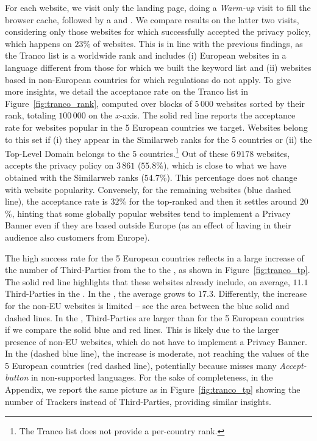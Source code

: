 For each website, we visit only the landing page, doing a \emph{Warm-up} visit to fill the browser cache, followed by a \BEFORE and \AFTER. We compare results on the latter two visits, considering only those websites for which \TOOL successfully accepted the privacy policy, which happens on $23$\% of websites. This is in line with the previous findings, as the Tranco list is a worldwide rank and includes (i) European websites in a language different from those for which we built the keyword list and (ii) websites based in non-European countries for which regulations do not apply. To give more insights, we detail the acceptance rate on the Tranco list in Figure~\ref{fig:tranco_rank}, computed over blocks of $5\,000$ websites sorted by their rank, totaling $100\,000$ on the $x$-axis. The solid red line reports the acceptance rate for websites popular in the 5 European countries we target. Websites belong to this set if (i) they appear in the Similarweb ranks for the 5 countries or (ii) the Top-Level Domain belongs to the 5 countries.\footnote{The Tranco list does not provide a per-country rank.} Out of these $6\,9178$ websites, \TOOL accepts the privacy policy on $3\,861$ ($55.8$\%), which is close to what we have obtained with the Similarweb ranks ($54.7\%$). This percentage does not change with website popularity. Conversely, for the remaining websites (blue dashed line), the acceptance rate is $32$\% for the top-ranked and then it settles around $20$\%, hinting that some globally popular websites tend to implement a Privacy Banner even if they are based outside Europe (as an effect of having in their audience also customers from Europe).

The high success rate for the 5 European countries reflects in a large increase of the number of Third-Parties from the \BEFORE to the \AFTER, as shown in Figure~\ref{fig:tranco_tp}. The solid red line highlights that these websites already include, on average, $11.1$ Third-Parties in the \BEFORE. In the \AFTER, the average grows to $17.3$. Differently, the increase for the non-EU websites is limited -- see the area between the blue solid and dashed lines. In the \BEFORE, Third-Parties are larger than for the 5 European countries if we compare the solid blue and red lines. This is likely due to the larger presence of non-EU websites, which do not have to implement a Privacy Banner. In the \AFTER (dashed blue line), the increase is moderate, not reaching the values of the 5 European countries (red dashed line), potentially because \TOOL misses many \emph{Accept-button} in non-supported languages. For the sake of completeness, in the Appendix, we report the same picture as in Figure~\ref{fig:tranco_tp} showing the number of Trackers instead of Third-Parties, providing similar insights.


